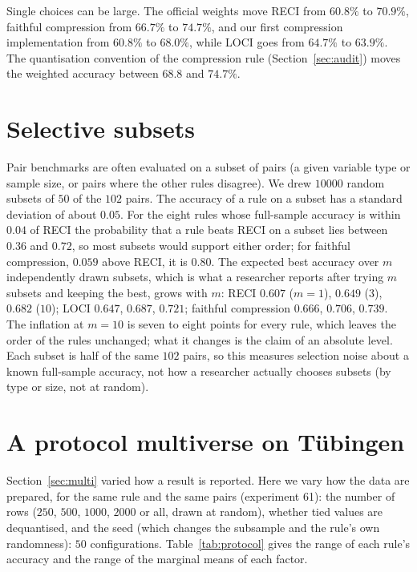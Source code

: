 Single choices can be large. The official weights move RECI from $60.8\%$ to $70.9\%$, faithful compression from $66.7\%$ to $74.7\%$, and our first compression implementation from $60.8\%$ to $68.0\%$, while LOCI goes from $64.7\%$ to $63.9\%$. The quantisation convention of the compression rule (Section~\ref{sec:audit}) moves the weighted accuracy between $68.8$ and $74.7\%$.

\section{Selective subsets}\label{sec:subsets}

Pair benchmarks are often evaluated on a subset of pairs (a given variable type or sample size, or pairs where the other rules disagree). We drew $10000$ random subsets of $50$ of the $102$ pairs. The accuracy of a rule on a subset has a standard deviation of about $0.05$. For the eight rules whose full-sample accuracy is within $0.04$ of RECI the probability that a rule beats RECI on a subset lies between $0.36$ and $0.72$, so most subsets would support either order; for faithful compression, $0.059$ above RECI, it is $0.80$. The expected best accuracy over $m$ independently drawn subsets, which is what a researcher reports after trying $m$ subsets and keeping the best, grows with $m$: RECI $0.607$ ($m=1$), $0.649$ ($3$), $0.682$ ($10$); LOCI $0.647$, $0.687$, $0.721$; faithful compression $0.666$, $0.706$, $0.739$. The inflation at $m=10$ is seven to eight points for every rule, which leaves the order of the rules unchanged; what it changes is the claim of an absolute level. Each subset is half of the same $102$ pairs, so this measures selection noise about a known full-sample accuracy, not how a researcher actually chooses subsets (by type or size, not at random).

\section{A protocol multiverse on T\"ubingen}\label{sec:protocol_multiverse}

Section~\ref{sec:multi} varied how a result is reported. Here we vary how the data are prepared, for the same rule and the same pairs (experiment 61): the number of rows ($250$, $500$, $1000$, $2000$ or all, drawn at random), whether tied values are dequantised, and the seed (which changes the subsample and the rule's own randomness): $50$ configurations. Table~\ref{tab:protocol} gives the range of each rule's accuracy and the range of the marginal means of each factor.

